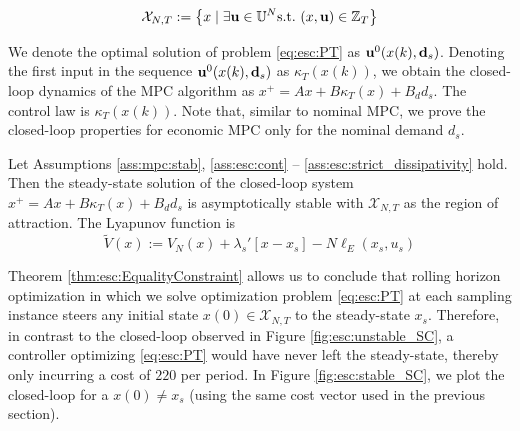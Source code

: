 \begin{equation}
\mathcal{X}_{N,T} := \left\lbrace x \mid \exists \mathbf{u} \in \mathbb{U}^N
  \text{s.t.~} (x,\mathbf{u}) \in \mathbb{Z}_T \right\rbrace
\end{equation}

We denote the optimal solution of problem \eqref{eq:esc:PT} as
$\mathbf{u}^0(x(k),\mathbf{d}_s)$. Denoting the first input in the sequence
$\mathbf{u}^0(x(k),\mathbf{d}_s)$ as $\kappa_T(x(k))$, we obtain the closed-loop
dynamics of the MPC algorithm as $x^+ = Ax+B\kappa_T(x)+B_dd_s$.  The
control law is $\kappa_T(x(k))$. Note that, similar to nominal MPC, we
prove the closed-loop properties for economic MPC only for the nominal
demand $d_s$.



\begin{theorem}
\label{thm:esc:EqualityConstraint}
Let Assumptions \ref{ass:mpc:stab}, \ref{ass:esc:cont} -- \ref{ass:esc:strict_dissipativity}
hold. Then the steady-state solution of the closed-loop system $x^+ =
Ax+B\kappa_T(x)+B_dd_s$ is asymptotically stable with
$\mathcal{X}_{N,T}$ as the region of attraction. The Lyapunov function
is
\[ \tilde{V}(x) := V_N(x) +\lambda_s'[x-x_s]-N\ell_E(x_s,u_s) \]
\end{theorem}
 
Theorem \ref{thm:esc:EqualityConstraint} allows us to conclude that
rolling horizon optimization in which we solve optimization problem
\eqref{eq:esc:PT} at each sampling instance steers any initial state
$x(0) \in \mathcal{X}_{N,T}$ to the steady-state $x_s$. Therefore, in
contrast to the closed-loop observed in Figure \ref{fig:esc:unstable_SC},
a controller optimizing \eqref{eq:esc:PT} would have never
left the steady-state, thereby only incurring a cost of $220$ per
period. In Figure \ref{fig:esc:stable_SC}, we plot the closed-loop for a
$x(0) \neq x_s$ (using the same cost vector used in the previous
section).





